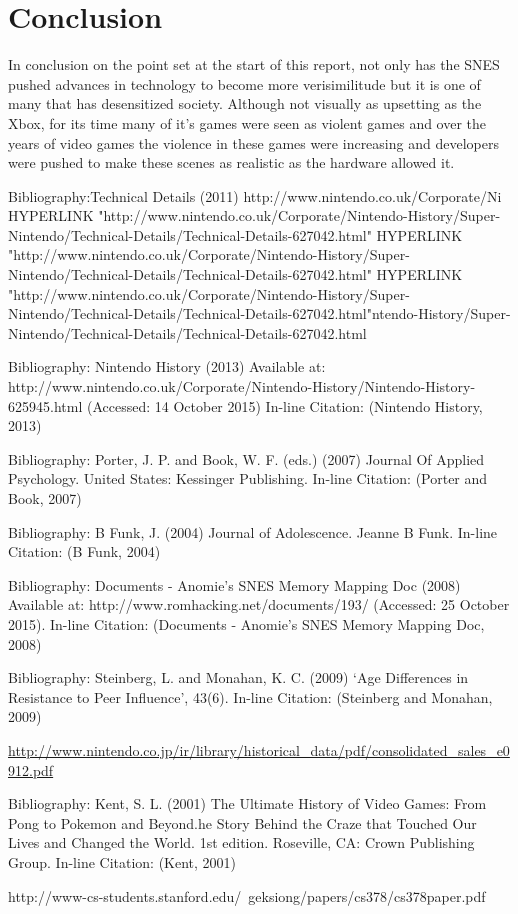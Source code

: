 \documentclass{scrartcl}
\begin{document}
	\section{Conclusion}
	
	In conclusion on the point set at the start of this report, not only has the SNES pushed advances in technology to become more verisimilitude but it is one of many that has desensitized society. Although not visually as upsetting as the Xbox, for its time many of it's games were seen as violent games and over the years of video games the violence in these games were increasing and developers were pushed to make these scenes as realistic as the hardware allowed it. 
	
	
	\begin{thebibliography}{}
		  Bibliography:Technical Details (2011)
		http://www.nintendo.co.uk/Corporate/Ni HYPERLINK "http://www.nintendo.co.uk/Corporate/Nintendo-History/Super-Nintendo/Technical-Details/Technical-Details-627042.html" HYPERLINK "http://www.nintendo.co.uk/Corporate/Nintendo-History/Super-Nintendo/Technical-Details/Technical-Details-627042.html" HYPERLINK "http://www.nintendo.co.uk/Corporate/Nintendo-History/Super-Nintendo/Technical-Details/Technical-Details-627042.html"ntendo-History/Super-Nintendo/Technical-Details/Technical-Details-627042.html
		
		Bibliography: Nintendo History (2013) Available at: http://www.nintendo.co.uk/Corporate/Nintendo-History/Nintendo-History-625945.html (Accessed: 14 October 2015) In-line Citation: (Nintendo History, 2013)
		
		Bibliography: Porter, J. P. and Book, W. F. (eds.) (2007) Journal Of Applied Psychology. United States: Kessinger Publishing. In-line Citation: (Porter and Book, 2007)
		
		Bibliography: B Funk, J. (2004) Journal of Adolescence. Jeanne B Funk. In-line Citation: (B Funk, 2004)
		
		Bibliography: Documents - Anomie’s SNES Memory Mapping Doc (2008) Available at: http://www.romhacking.net/documents/193/ (Accessed: 25 October 2015). In-line Citation: (Documents - Anomie’s SNES Memory Mapping Doc, 2008)
		
		Bibliography: Steinberg, L. and Monahan, K. C. (2009) ‘Age Differences in Resistance to Peer Influence’, 43(6). In-line Citation: (Steinberg and Monahan, 2009)
		
		 \url{http://www.nintendo.co.jp/ir/library/historical_data/pdf/consolidated_sales_e0912.pdf}
		
		Bibliography: Kent, S. L. (2001) The Ultimate History of Video Games: From Pong to Pokemon and Beyond.he Story Behind the Craze that Touched Our Lives and Changed the World. 1st edition. Roseville, CA: Crown Publishing Group. In-line Citation: (Kent, 2001)
		
		http://www-cs-students.stanford.edu/~geksiong/papers/cs378/cs378paper.pdf
		
	\end{thebibliography}
\end{document}
